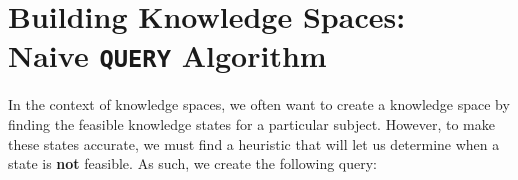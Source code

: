 \documentclass[11pt,letterpaper,dvipsnames]{article}
\theoremstyle{definition}
\newtheorem{definition}{Definition}[section]
\newcommand{\es}[1]{\EuScript{#1}}
\begin{document}











\section{Building Knowledge Spaces: \\Naive \texttt{QUERY} Algorithm}

In the context of knowledge spaces, we often want to create a knowledge space by finding the feasible knowledge states for a particular subject. However, to make these states accurate, we must find a heuristic that will let us determine when a state is \textbf{not} feasible. As such, we create the following query:
\end{document}
